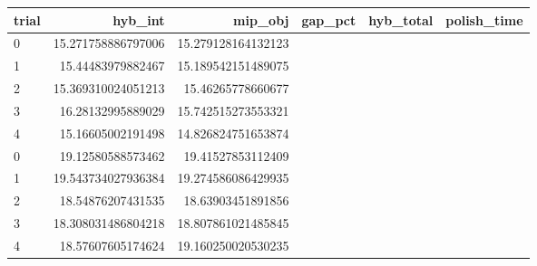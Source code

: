 \begin{tabular}{lrrrrr}
\hline
trial & hyb_int & mip_obj & gap_pct & hyb_total & polish_time \\ \hline
0 & 15.271758886797006 & 15.279128164132123 &  &  &  \\
1 & 15.44483979882467 & 15.189542151489075 &  &  &  \\
2 & 15.369310024051213 & 15.46265778660677 &  &  &  \\
3 & 16.28132995889029 & 15.742515273553321 &  &  &  \\
4 & 15.16605002191498 & 14.826824751653874 &  &  &  \\
0 & 19.12580588573462 & 19.41527853112409 &  &  &  \\
1 & 19.543734027936384 & 19.274586086429935 &  &  &  \\
2 & 18.54876207431535 & 18.63903451891856 &  &  &  \\
3 & 18.308031486804218 & 18.807861021485845 &  &  &  \\
4 & 18.57607605174624 & 19.160250020530235 &  &  &  \\
\hline
\end{tabular}
